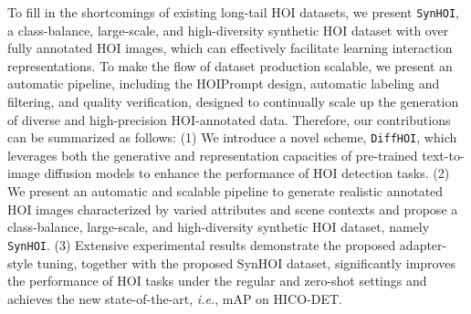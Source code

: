 \documentclass{article}
\begin{document}
To fill in the shortcomings of existing long-tail HOI datasets, we present \texttt{SynHOI}, a class-balance, large-scale, and high-diversity synthetic HOI dataset with over  fully annotated HOI images, 
which can effectively facilitate learning interaction representations. To make the flow of dataset production scalable, we present an automatic pipeline, including the HOIPrompt design, automatic labeling and filtering, and quality verification, designed to continually scale up the generation of diverse and high-precision HOI-annotated data. 
Therefore, our contributions can be summarized as follows:
(1) We introduce a novel scheme, \texttt{DiffHOI}, which leverages both the generative and representation capacities of pre-trained text-to-image diffusion models to enhance the performance of HOI detection tasks.
(2) We present an automatic and scalable pipeline to generate realistic annotated HOI images characterized by varied attributes and scene contexts and propose a class-balance, large-scale, and high-diversity synthetic HOI dataset, namely \texttt{SynHOI}.
(3) Extensive experimental results demonstrate the proposed adapter-style tuning, together with the proposed SynHOI dataset, significantly improves the performance of HOI tasks under the regular and zero-shot settings and achieves the new state-of-the-art, \textit{i.e.},  mAP on HICO-DET.
\end{document}
